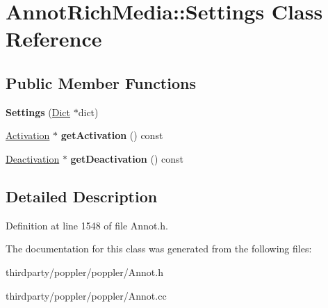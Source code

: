 \hypertarget{class_annot_rich_media_1_1_settings}{}\section{Annot\+Rich\+Media\+:\+:Settings Class Reference}
\label{class_annot_rich_media_1_1_settings}
\subsection*{Public Member Functions}
\begin{DoxyCompactItemize}
\item 
\mbox{\label{class_annot_rich_media_1_1_settings_ac15451f9115a25a2e21d5588a929acbe}} 
{\bfseries Settings} (\hyperlink{class_dict}{Dict} $\ast$dict)
\item 
\mbox{\label{class_annot_rich_media_1_1_settings_ab49f6580f771a3698a7498c0ce7abff4}} 
\hyperlink{class_annot_rich_media_1_1_activation}{Activation} $\ast$ {\bfseries get\+Activation} () const
\item 
\mbox{\label{class_annot_rich_media_1_1_settings_a0b9f9773bcc8cb5717c91d3f0fc49905}} 
\hyperlink{class_annot_rich_media_1_1_deactivation}{Deactivation} $\ast$ {\bfseries get\+Deactivation} () const
\end{DoxyCompactItemize}


\subsection{Detailed Description}


Definition at line 1548 of file Annot.\+h.



The documentation for this class was generated from the following files\+:\begin{DoxyCompactItemize}
\item 
thirdparty/poppler/poppler/Annot.\+h\item 
thirdparty/poppler/poppler/Annot.\+cc\end{DoxyCompactItemize}
